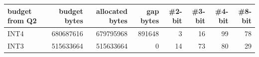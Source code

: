 \begin{tabular}{lrrrrrrr}
\toprule
budget from Q2 & budget bytes & allocated bytes & gap bytes & \#2-bit & \#3-bit & \#4-bit & \#8-bit \\
\midrule
INT4 & 680687616 & 679795968 & 891648 & 3 & 16 & 99 & 78 \\
INT3 & 515633664 & 515633664 & 0 & 14 & 73 & 80 & 29 \\
\bottomrule
\end{tabular}
